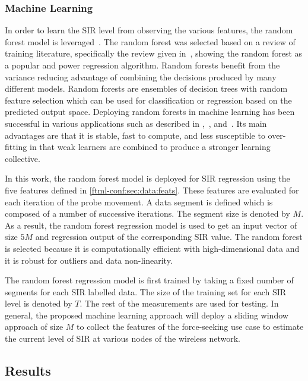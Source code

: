 \subsubsection{Machine Learning}\label{ftml-conf:sec:data:ML}
In order to learn the SIR level from observing the various features, the random forest model is leveraged~\cite{Breiman2001}.  The random forest was selected based on a review of training literature, specifically the review given in~\cite{geron2017hands}, showing the random forest as a popular and power regression algorithm.  Random forests benefit from the variance reducing advantage of combining the decisions produced by many different models.  Random forests are ensembles of decision trees with random feature selection which can be used for classification or regression based on the predicted output space. Deploying random forests in machine learning has been successful in various applications such as described in \cite{Zhen2015},~\cite{Shotton2011}, and~\cite{Zhen2014}. Its main advantages are that it is stable, fast to compute, and less susceptible to over-fitting in that weak learners are combined to produce a stronger learning collective.

In this work, the random forest model is deployed for SIR regression using the five features defined in \ref{ftml-conf:sec:data:feats}. These features are evaluated for each iteration of the probe movement. A data segment is defined which is composed of a number of successive iterations.  The segment size is denoted by $M$. As a result, the random forest regression model is used to get an input vector of size $5M$ and regression output of the corresponding SIR value. The random forest is selected because it is computationally efficient with high-dimensional data and it is robust for outliers and data non-linearity. 

The random forest regression model is first trained by taking a fixed number of segments for each SIR labelled data. The size of the training set for each SIR level is denoted by $T$. The rest of the measurements are used for testing. In general, the proposed machine learning approach will deploy a sliding window approach of size $M$ to collect the features of the force-seeking use case to estimate the current level of SIR at various nodes of the wireless network. 

\subsection{Results} \label{ftml-conf:sec:results}  

